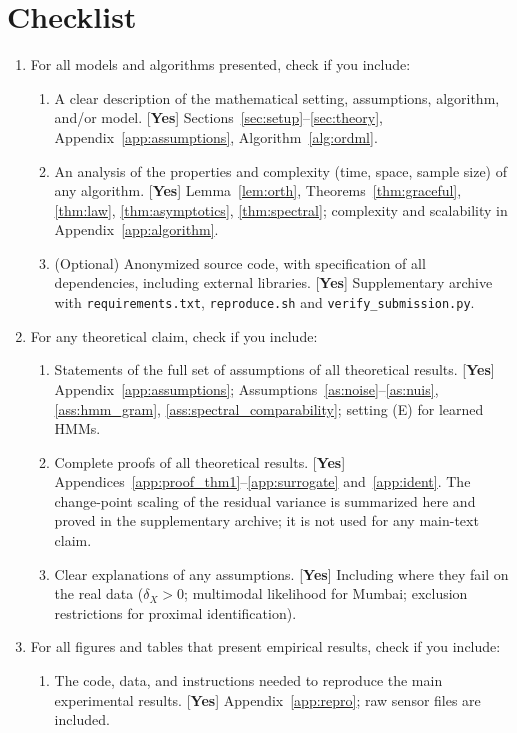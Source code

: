 \section*{Checklist}
\begin{enumerate}
\item For all models and algorithms presented, check if you include:
\begin{enumerate}
  \item A clear description of the mathematical setting, assumptions, algorithm, and/or model. [\textbf{Yes}] Sections~\ref{sec:setup}--\ref{sec:theory}, Appendix~\ref{app:assumptions}, Algorithm~\ref{alg:ordml}.
  \item An analysis of the properties and complexity (time, space, sample size) of any algorithm. [\textbf{Yes}] Lemma~\ref{lem:orth}, Theorems~\ref{thm:graceful}, \ref{thm:law}, \ref{thm:asymptotics}, \ref{thm:spectral}; complexity and scalability in Appendix~\ref{app:algorithm}.
  \item (Optional) Anonymized source code, with specification of all dependencies, including external libraries. [\textbf{Yes}] Supplementary archive with \texttt{requirements.txt}, \texttt{reproduce.sh} and \texttt{verify\_submission.py}.
\end{enumerate}
\item For any theoretical claim, check if you include:
\begin{enumerate}
  \item Statements of the full set of assumptions of all theoretical results. [\textbf{Yes}] Appendix~\ref{app:assumptions}; Assumptions~\ref{as:noise}--\ref{as:nuis}, \ref{ass:hmm_gram}, \ref{ass:spectral_comparability}; setting (E) for learned HMMs.
  \item Complete proofs of all theoretical results. [\textbf{Yes}] Appendices~\ref{app:proof_thm1}--\ref{app:surrogate} and~\ref{app:ident}. The change-point scaling of the residual variance is summarized here and proved in the supplementary archive; it is not used for any main-text claim.
  \item Clear explanations of any assumptions. [\textbf{Yes}] Including where they fail on the real data ($\delta_X>0$; multimodal likelihood for Mumbai; exclusion restrictions for proximal identification).
\end{enumerate}
\item For all figures and tables that present empirical results, check if you include:
\begin{enumerate}
  \item The code, data, and instructions needed to reproduce the main experimental results. [\textbf{Yes}] Appendix~\ref{app:repro}; raw sensor files are included.

\end{enumerate}
\end{enumerate}
